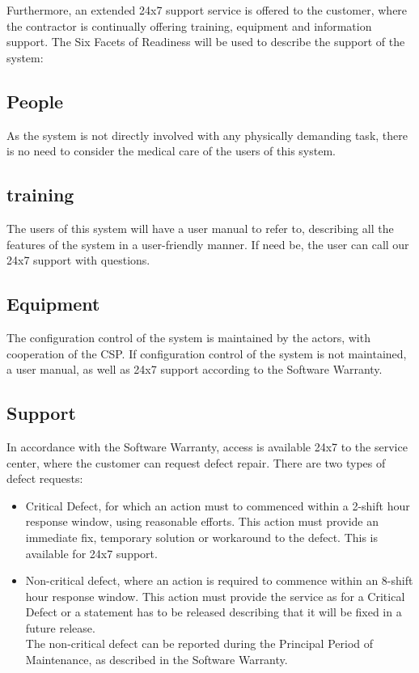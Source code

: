 \noindent Furthermore, an extended 24x7 support service is offered to the customer, where the contractor is continually offering training, equipment and information support.
The Six Facets of Readiness \cite{Six_facets} will be used to describe the support of the system:

\subsection{People}
As the system is not directly involved with any physically demanding task, there is no need to consider the medical care of the users of this system.

\subsection{training}
The users of this system will have a user manual to refer to, describing all the features of the system in a user-friendly manner. If need be, the user can call our 24x7 support with questions.

\subsection{Equipment}
The configuration control of the system is maintained by the actors, with cooperation of the CSP. If configuration control of the system is not maintained, a user manual, as well as 24x7 support according to the Software Warranty. 

\subsection{Support}
In accordance with the Software Warranty, access is available 24x7 to the service center, where the customer can request defect repair. There are two types of defect requests:
\begin{itemize}
	\itemsep0em
	\item Critical Defect, for which an action must to commenced within a 2-shift hour response window, using reasonable efforts. This action must provide an immediate fix, temporary solution or workaround to the defect. This is available for 24x7 support.
	\item Non-critical defect, where an action is required to commence within an 8-shift hour response window. This action must provide the service as for a Critical Defect or a statement has to be released describing that it will be fixed in a future release. \\
	The non-critical defect can be reported during the Principal Period of Maintenance, as described in the Software Warranty.
\end{itemize}


